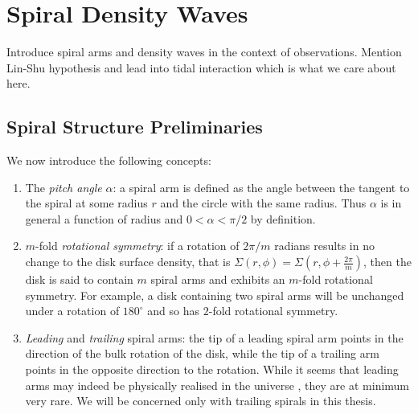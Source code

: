 

\section{Spiral Density Waves}

Introduce spiral arms and density waves in the context of observations. Mention Lin-Shu hypothesis and lead into tidal interaction which is what we care about here.

\subsection{Spiral Structure Preliminaries}
We now introduce the following concepts:
\begin{enumerate}
    \item The \textit{pitch angle} $\alpha$: a spiral arm is defined as the angle between the tangent to the spiral at some radius $r$ and the circle with the same radius. 
    Thus $\alpha$ is in general a function of radius and $0 < \alpha < \pi/2$ by definition.
    \item $m$-fold \textit{rotational symmetry}: if a rotation of $2\pi/m$ radians results in no change to the disk surface density, that is $\Sigma(r,\phi)=\Sigma(r,\phi+\frac{2\pi}{m})$, then the disk is said to contain $m$ spiral arms and exhibits an $m$-fold rotational symmetry. 
    For example, a disk containing two spiral arms will be unchanged under a rotation of $180^\circ$ and so has $2$-fold rotational symmetry.
    \item \textit{Leading} and \textit{trailing} spiral arms: the tip of a leading spiral arm points in the direction of the bulk rotation of the disk, while the tip of a trailing arm points in the opposite direction to the rotation. 
    While it seems that leading arms may indeed be physically realised in the universe \citep[eg.][]{vaisanen2008}, they are at minimum very rare. 
    We will be concerned only with trailing spirals in this thesis.
\end{enumerate}


